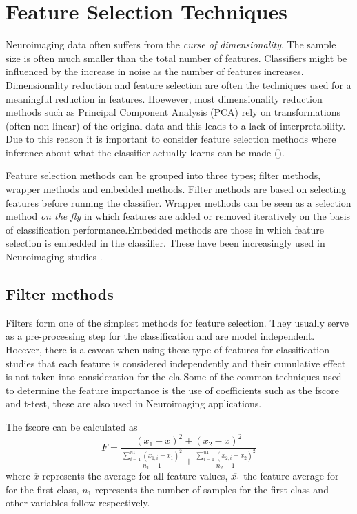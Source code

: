 \documentclass[msthesis.tex]{subfiles}
\begin{document}
\section{Feature Selection Techniques}
\label{sec:feature_selection}
Neuroimaging data often suffers from the \textit{curse of dimensionality}. The sample size is often much smaller than the total number of features. Classifiers might be influenced by the increase in noise as the number of features increases. Dimensionality reduction and feature selection are often the techniques used for a meaningful reduction in features. Hoewever, most dimensionality reduction methods such as Principal Component Analysis (PCA) rely on transformations (often non-linear) of the original data and this leads to a lack of interpretability. Due to this reason it is important to consider feature selection methods where inference about what the classifier actually learns can be made (\cite{shi2018feature}). 

Feature selection methods can be grouped into three types; filter methods, wrapper methods and embedded methods. Filter methods are based on selecting features before running the classifier. Wrapper methods can be seen as a selection method \textit{on the fly} in which features are added or removed iteratively on the basis of classification performance.Embedded methods are those in which feature selection is embedded in the classifier. These have been increasingly used in Neuroimaging studies \cite{tohka2016comparison}.

\subsection{Filter methods}
\label{subsec:filtermethods}
Filters form one of the simplest methods for feature selection. They usually serve as a pre-processing step for the classification and are model independent. Hoeever, there is a caveat when using these type of features for classification studies that each feature is considered independently and their cumulative effect is not taken into consideration for the cla
Some of the common techniques used to determine the feature importance is the use of coefficients such as the fscore and t-test, these are also used in Neuroimaging applications. 

The fscore can be calculated as 
\begin{equation}
\label{eq:fscores}
    F = \frac{(\overline{x_{1}} - \overline{x})^2 + (\overline{x_{2}} - \overline{x})^2}
    {\frac{\sum_{i=1}^{n1}(x_{1,i} - \overline{x_{1}})^2}{n_{1} -1} + \frac{\sum_{i=1}^{n1}(x_{2,i} - \overline{x_{2}})^2}{n_{2} -1}}
\end{equation}
where $\overline{x}$ represents the average for all feature values, $\overline{x_{1}}$ the feature average for for the first class, $n_{1}$ represents the number of samples for the first class and other variables follow respectively.
\end{document}
